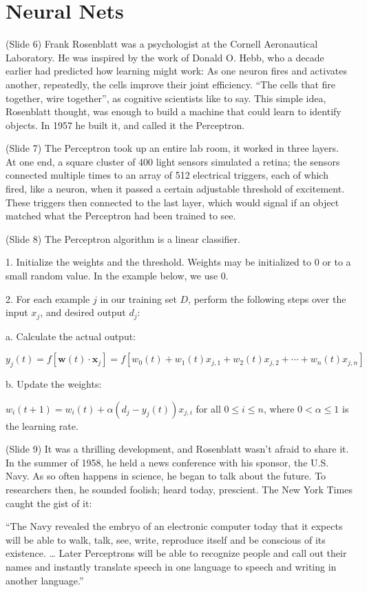 \documentclass[twocolumn]{article}
\begin{document}
\section{Neural Nets}
(Slide 6) Frank Rosenblatt was a psychologist at the Cornell Aeronautical
Laboratory. He was inspired by the work of Donald O. Hebb, who a decade earlier
had predicted how learning might work: As one neuron fires and activates
another, repeatedly, the cells improve their joint efficiency. ``The cells that
fire together, wire together'', as cognitive scientists like to say. This simple
idea, Rosenblatt thought, was enough to build a machine that could learn to
identify objects. In 1957 he built it, and called it the Perceptron.

(Slide 7) The Perceptron took up an entire lab room, it worked in three
layers. At one end, a square cluster of 400 light sensors simulated a retina;
the sensors connected multiple times to an array of 512 electrical triggers,
each of which fired, like a neuron, when it passed a certain adjustable
threshold of excitement. These triggers then connected to the last layer, which
would signal if an object matched what the Perceptron had been trained to see.

(Slide 8) The Perceptron algorithm is a linear classifier.

1. Initialize the weights and the threshold. Weights may be initialized to 0 or
to a small random value. In the example below, we use 0.

2. For each example \(j\) in our training set \(D\), perform the following steps
over the input \(x_{j}\), and desired output \(d_{j}\):

a. Calculate the actual output:

\(y_j(t) = f[\mathbf{w}(t)\cdot\mathbf{x}_j] = f[w_0(t) + w_1(t)x_{j,1} +
w_2(t)x_{j,2} + \dotsb + w_n(t)x_{j,n}]\)

b. Update the weights:

\(w_i(t+1) = w_i(t) + \alpha (d_j - y_j(t)) x_{j,i} \) for all \(0 \leq i \leq
n\), where \(0 < \alpha \leq 1\) is the learning rate.

(Slide 9) It was a thrilling development, and Rosenblatt wasn't afraid to share
it. In the summer of 1958, he held a news conference with his sponsor, the
U.S. Navy. As so often happens in science, he began to talk about the future. To
researchers then, he sounded foolish; heard today, prescient. The New York Times
caught the gist of it:

``The Navy revealed the embryo of an electronic computer today that it expects
will be able to walk, talk, see, write, reproduce itself and be conscious of its
existence. … Later Perceptrons will be able to recognize people and call out
their names and instantly translate speech in one language to speech and writing
in another language.''
\end{document}
